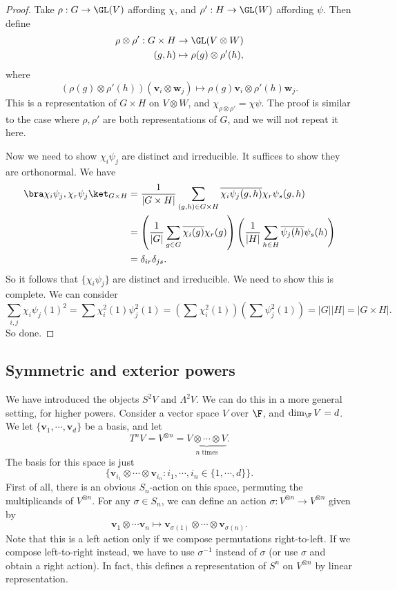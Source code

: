 \documentclass[a4paper]{article}
\begin{document}
\begin{proof}
  Take $\rho: G \to \GL(V)$ affording $\chi$, and $\rho': H \to \GL(W)$ affording $\psi$. Then define
  \begin{align*}
    \rho \otimes \rho': G \times H &\to \GL(V\otimes W)\\
    (g, h) &\mapsto \rho(g) \otimes \rho'(h),
  \end{align*}
  where
  \[
    (\rho(g)\otimes \rho'(h))(\mathbf{v}_i \otimes \mathbf{w}_j) \mapsto \rho(g) \mathbf{v}_i \otimes \rho'(h) \mathbf{w}_j.
  \]
  This is a representation of $G \times H$ on $V\otimes W$, and $\chi_{\rho\otimes \rho'} = \chi \psi$. The proof is similar to the case where $\rho, \rho'$ are both representations of $G$, and we will not repeat it here.

  Now we need to show $\chi_i \psi_j$ are distinct and irreducible. It suffices to show they are orthonormal. We have
  \begin{align*}
    \bra \chi_i \psi_j, \chi_r \psi_j\ket_{G\times H} &= \frac{1}{|G\times H|} \sum_{(g, h) \in G\times H} \overline{\chi_i \psi_j (g, h)}\chi_r \psi_s(g, h)\\
    &= \left(\frac{1}{|G|} \sum_{g \in G} \overline{\chi_i (g)}\chi_r(g)\right)\left(\frac{1}{|H|}\sum_{h \in H} \overline{\psi_j(h)} \psi_s(h)\right)\\
    &= \delta_{ir} \delta_{js}.
  \end{align*}
  So it follows that $\{\chi_i \psi_j\}$ are distinct and irreducible. We need to show this is complete. We can consider
  \[
    \sum_{i, j} \chi_i \psi_j (1)^2 = \sum \chi_i^2 (1) \psi_j^2(1) = \left(\sum \chi_i^2(1)\right)\left(\sum \psi_j^2(1)\right) = |G||H| = |G\times H|.
  \]
  So done.
\end{proof}
\subsection{Symmetric and exterior powers}
We have introduced the objects $S^2 V$ and $\Lambda^2 V$. We can do this in a more general setting, for higher powers. Consider a vector space $V$ over $\F$, and $\dim_\F V = d$. We let $\{\mathbf{v}_1, \cdots, \mathbf{v}_d\}$ be a basis, and let
\[
  T^nV = V^{\otimes n} = \underbrace{V\otimes \cdots \otimes V}_{n\text{ times}}.
\]
The basis for this space is just
\[
  \{\mathbf{v}_{i_1} \otimes \cdots \otimes \mathbf{v}_{i_n}: i_1, \cdots, i_n \in \{1, \cdots, d\}\}.
\]
First of all, there is an obvious $S_n$-action on this space, permuting the multiplicands of $V^{\otimes n}$. For any $\sigma \in S_n$, we can define an action $\sigma: V^{\otimes n} \to V^{\otimes n}$ given by
\[
  \mathbf{v}_1 \otimes \cdots \mathbf{v}_n \mapsto \mathbf{v}_{\sigma(1)} \otimes \cdots \otimes \mathbf{v}_{\sigma(n)}.
\]
Note that this is a left action only if we compose permutations right-to-left. If we compose left-to-right instead, we have to use $\sigma^{-1}$ instead of $\sigma$ (or use $\sigma$ and obtain a right action). In fact, this defines a representation of $S^n$ on $V^{\otimes n}$ by linear representation.
\end{document}
